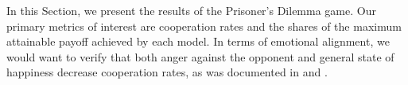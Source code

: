 \documentclass{article}
\begin{document}




In this Section, we present the results of the Prisoner's Dilemma game. Our primary metrics of interest are cooperation rates and the shares of the maximum attainable payoff achieved by each model. In terms of emotional alignment, we would want to verify that both anger against the opponent and general state of happiness decrease cooperation rates, as was documented in \cite{PROTO2019209} and \cite{fpsyg.2013.00469}. 
\end{document}
